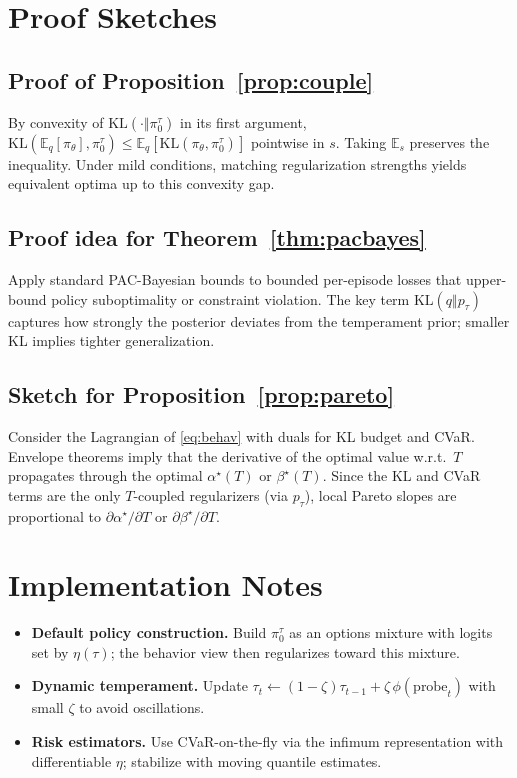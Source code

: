 \documentclass[10pt]{article}
\theoremstyle{plain}
\theoremstyle{definition}
\theoremstyle{remark}
\newcommand{\E}{\mathbb{E}}
\newcommand{\1}{\mathds{1}}
\newcommand{\KL}{\mathrm{KL}}
\begin{document}
\section{Proof Sketches}
\subsection*{Proof of Proposition~\ref{prop:couple}}
By convexity of $\KL(\cdot\Vert \pi_0^\tau)$ in its first argument,
$\KL(\E_q[\pi_\theta],\pi_0^\tau)\le \E_q[\KL(\pi_\theta,\pi_0^\tau)]$ pointwise in $s$.
Taking $\E_s$ preserves the inequality. Under mild conditions, matching regularization strengths yields equivalent optima up to this convexity gap.

\subsection*{Proof idea for Theorem~\ref{thm:pacbayes}}
Apply standard PAC-Bayesian bounds to bounded per-episode losses that upper-bound policy suboptimality or constraint violation. The key term $\KL(q\Vert p_\tau)$ captures how strongly the posterior deviates from the temperament prior; smaller KL implies tighter generalization.

\subsection*{Sketch for Proposition~\ref{prop:pareto}}
Consider the Lagrangian of \eqref{eq:behav} with duals for KL budget and CVaR. Envelope theorems imply that the derivative of the optimal value w.r.t.\ $T$ propagates through the optimal $\alpha^\star(T)$ or $\beta^\star(T)$. Since the KL and CVaR terms are the only $T$-coupled regularizers (via $p_\tau$), local Pareto slopes are proportional to $\partial \alpha^\star/\partial T$ or $\partial \beta^\star/\partial T$.

\section{Implementation Notes}
\begin{itemize}[leftmargin=1.5em]
\item \textbf{Default policy construction.} Build $\pi_0^\tau$ as an options mixture with logits set by $\eta(\tau)$; the behavior view then regularizes toward this mixture.
\item \textbf{Dynamic temperament.} Update $\tau_t \leftarrow (1-\zeta)\tau_{t-1} + \zeta\,\phi(\text{probe}_t)$ with small $\zeta$ to avoid oscillations.
\item \textbf{Risk estimators.} Use CVaR-on-the-fly via the infimum representation with differentiable $\eta$; stabilize with moving quantile estimates.
\end{itemize}
\end{document}
